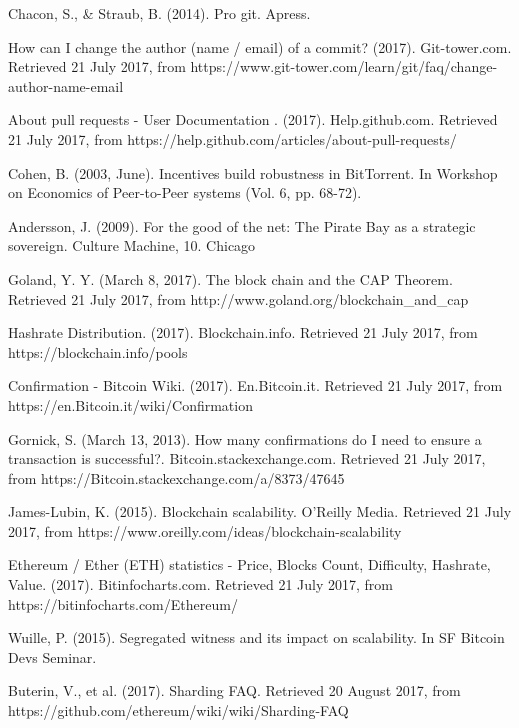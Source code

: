 \begin{thebibliography}{99}
Chacon, S., \& Straub, B. (2014). Pro git. Apress.

How can I change the author (name / email) of a commit? (2017). Git-tower.com. Retrieved 21 July 2017, from https://www.git-tower.com/learn/git/faq/change-author-name-email

About pull requests - User Documentation . (2017). Help.github.com. Retrieved 21 July 2017, from https://help.github.com/articles/about-pull-requests/

Cohen, B. (2003, June). Incentives build robustness in BitTorrent. In Workshop on Economics of Peer-to-Peer systems (Vol. 6, pp. 68-72).

Andersson, J. (2009). For the good of the net: The Pirate Bay as a strategic sovereign. Culture Machine, 10.
Chicago 

Goland, Y. Y. (March 8, 2017). The block chain and the CAP Theorem. Retrieved 21 July 2017, from http://www.goland.org/blockchain\_and\_cap

Hashrate Distribution. (2017). Blockchain.info. Retrieved 21 July 2017, from https://blockchain.info/pools

Confirmation - Bitcoin Wiki. (2017). En.Bitcoin.it. Retrieved 21 July 2017, from https://en.Bitcoin.it/wiki/Confirmation

Gornick, S. (March 13, 2013). How many confirmations do I need to ensure a transaction is successful?. Bitcoin.stackexchange.com. Retrieved 21 July 2017, from https://Bitcoin.stackexchange.com/a/8373/47645

James-Lubin, K. (2015). Blockchain scalability. O'Reilly Media. Retrieved 21 July 2017, from https://www.oreilly.com/ideas/blockchain-scalability

Ethereum / Ether (ETH) statistics - Price, Blocks Count, Difficulty, Hashrate, Value. (2017). Bitinfocharts.com. Retrieved 21 July 2017, from https://bitinfocharts.com/Ethereum/

Wuille, P. (2015). Segregated witness and its impact on scalability. In SF Bitcoin Devs Seminar.

Buterin, V., et al. (2017). Sharding FAQ. Retrieved 20 August 2017, from https://github.com/ethereum/wiki/wiki/Sharding-FAQ


\end{thebibliography}
